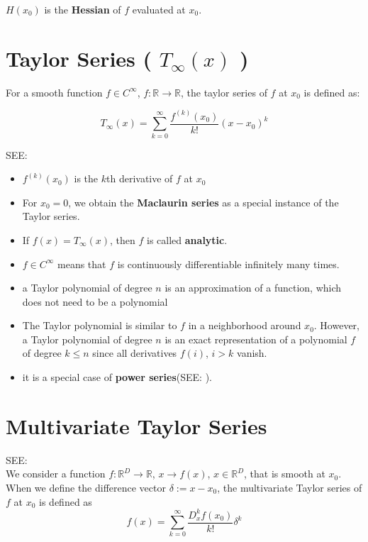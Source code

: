 $H(x_0)$ is the \textbf{Hessian} of $f$ evaluated at $x_0$.


\section{Taylor Series ( $T_\infty(x)$ )}\label{Taylor Series}
For a smooth function $f \in C^\infty$, $f : \mathbb{R} \rightarrow \mathbb{R}$, the taylor series of $f$ at $x_0$ is defined as:

\[
    T_\infty(x) = \sum_{k=0}^{\infty}\displaystyle\dfrac{f^{(k)}(x_0)}{k!}(x-x_0)^k
\]

SEE: 
\begin{itemize}
    \item $f^{(k)}(x_0)$ is the $k$th derivative of $f$ at $x_0$

    \item For $x_0 = 0$, we obtain the \textbf{Maclaurin series} as a special instance of the Taylor series. 
    
    \item If $f(x) = T_\infty(x)$, then $f$ is called \textbf{analytic}.
    
    \item $f \in C^\infty$ means that $f$ is continuously differentiable infinitely many times.

    \item a Taylor polynomial of degree $n$ is an approximation of a function, which does not need to be a polynomial

    \item The Taylor polynomial is similar to $f$ in a neighborhood around $x_0$. However, a Taylor polynomial of degree $n$ is an exact representation of a polynomial $f$ of degree $k \leq n$ since all derivatives $f(i)$, $i > k$ vanish.

    \item it is a special case of \textbf{power series}(SEE: ).

\end{itemize}


\section{Multivariate Taylor Series}\label{Multivariate Taylor Series}

SEE: \\
We consider a function $f : \mathbb{R}^D \rightarrow \mathbb{R}$, $x \rightarrow f(x)$, $x \in \mathbb{R}^D$, that is smooth at $x_0$. When we define the difference vector $\delta := x - x_0$, the multivariate Taylor series of $f$ at $x_0$ is defined as
\[
    f(x) = \sum_{k=0}^{\infty} \displaystyle\dfrac{D_x^k f(x_0)}{k!}\delta^k
\]

